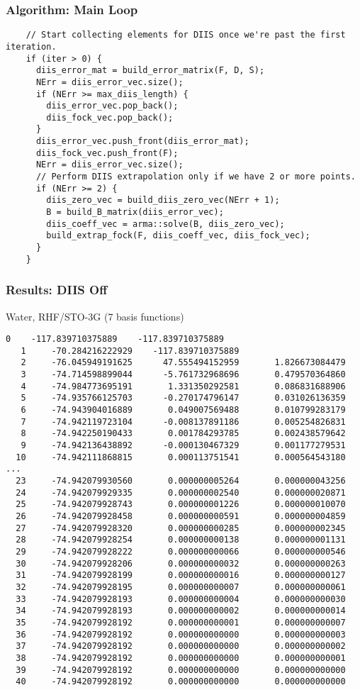 \documentclass[10pt,compress,red]{beamer}
\begin{document}
\begin{frame}[fragile]
\frametitle{Algorithm: Main Loop}
\begin{verbatim}
    // Start collecting elements for DIIS once we're past the first iteration.
    if (iter > 0) {
      diis_error_mat = build_error_matrix(F, D, S);
      NErr = diis_error_vec.size();
      if (NErr >= max_diis_length) {
        diis_error_vec.pop_back();
        diis_fock_vec.pop_back();
      }
      diis_error_vec.push_front(diis_error_mat);
      diis_fock_vec.push_front(F);
      NErr = diis_error_vec.size();
      // Perform DIIS extrapolation only if we have 2 or more points.
      if (NErr >= 2) {
        diis_zero_vec = build_diis_zero_vec(NErr + 1);
        B = build_B_matrix(diis_error_vec);
        diis_coeff_vec = arma::solve(B, diis_zero_vec);
        build_extrap_fock(F, diis_coeff_vec, diis_fock_vec);
      }
    }
\end{verbatim}
\end{frame}

\begin{frame}[fragile]
  \frametitle{Results: DIIS Off}
  Water, RHF/STO-3G (7 basis functions)
\begin{Verbatim}[fontsize=\tiny]
   0    -117.839710375889    -117.839710375889
   1     -70.284216222929    -117.839710375889
   2     -76.045949191625      47.555494152959       1.826673084479
   3     -74.714598899044      -5.761732968696       0.479570364860
   4     -74.984773695191       1.331350292581       0.086831688906
   5     -74.935766125703      -0.270174796147       0.031026136359
   6     -74.943904016889       0.049007569488       0.010799283179
   7     -74.942119723104      -0.008137891186       0.005254826831
   8     -74.942250190433       0.001784293785       0.002438579642
   9     -74.942136438892      -0.000130467329       0.001177279531
  10     -74.942111868815       0.000113751541       0.000564543180
...
  23     -74.942079930560       0.000000005264       0.000000043256
  24     -74.942079929335       0.000000002540       0.000000020871
  25     -74.942079928743       0.000000001226       0.000000010070
  26     -74.942079928458       0.000000000591       0.000000004859
  27     -74.942079928320       0.000000000285       0.000000002345
  28     -74.942079928254       0.000000000138       0.000000001131
  29     -74.942079928222       0.000000000066       0.000000000546
  30     -74.942079928206       0.000000000032       0.000000000263
  31     -74.942079928199       0.000000000016       0.000000000127
  32     -74.942079928195       0.000000000007       0.000000000061
  33     -74.942079928193       0.000000000004       0.000000000030
  34     -74.942079928193       0.000000000002       0.000000000014
  35     -74.942079928192       0.000000000001       0.000000000007
  36     -74.942079928192       0.000000000000       0.000000000003
  37     -74.942079928192       0.000000000000       0.000000000002
  38     -74.942079928192       0.000000000000       0.000000000001
  39     -74.942079928192       0.000000000000       0.000000000000
  40     -74.942079928192       0.000000000000       0.000000000000
\end{Verbatim}
\end{frame}
\end{document}
